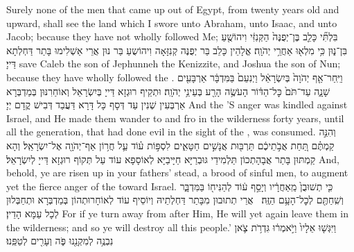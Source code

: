 {Surely none of the men that came up out of Egypt, from twenty years old and upward, shall see the land which I swore unto Abraham, unto Isaac, and unto Jacob; because they have not wholly followed Me;}{}
{בִּלְתִּ֞י כָּלֵ֤ב בֶּן־יְפֻנֶּה֙ הַקְּנִזִּ֔י וִיהוֹשֻׁ֖עַ בִּן־נ֑וּן כִּ֥י מִלְא֖וּ אַחֲרֵ֥י יְהֹוָֽה׃
}
{אֱלָהֵין כָּלֵב בַּר יְפֻנֶּה קְנִזָּאָה וִיהוֹשֻעַ בַּר נוּן אֲרֵי אַשְׁלִימוּ בָּתַר דַּחְלְתָא דַּייָ׃}
{save Caleb the son of Jephunneh the Kenizzite, and Joshua the son of Nun; because they have wholly followed the \lord.}{}
{וַיִּֽחַר־אַ֤ף יְהֹוָה֙ בְּיִשְׂרָאֵ֔ל וַיְנִעֵם֙ בַּמִּדְבָּ֔ר אַרְבָּעִ֖ים שָׁנָ֑ה עַד־תֹּם֙ כׇּל־הַדּ֔וֹר הָעֹשֶׂ֥ה הָרַ֖ע בְּעֵינֵ֥י יְהֹוָֽה׃
}
{וּתְקֵיף רוּגְזָא דַּייָ בְּיִשְׂרָאֵל וְאוֹחַרִנּוּן בְּמַדְבְּרָא אַרְבְּעִין שְׁנִין עַד דְּסָף כָּל דָּרָא דַּעֲבַד דְּבִישׁ קֳדָם יְיָ׃}
{And the \lord’S anger was kindled against Israel, and He made them wander to and fro in the wilderness forty years, until all the generation, that had done evil in the sight of the \lord, was consumed.}{}
{וְהִנֵּ֣ה קַמְתֶּ֗ם תַּ֚חַת אֲבֹ֣תֵיכֶ֔ם תַּרְבּ֖וּת אֲנָשִׁ֣ים חַטָּאִ֑ים לִסְפּ֣וֹת ע֗וֹד עַ֛ל חֲר֥וֹן אַף־יְהֹוָ֖ה אֶל־יִשְׂרָאֵֽל׃
}
{וְהָא קַמְתּוּן בָּתַר אֲבָהָתְכוֹן תַּלְמִידֵי גּוּבְרַיָּא חַיָּיבַיָּא לְאוֹסָפָא עוֹד עַל תְּקוֹף רוּגְזָא דַּייָ לְיִשְׂרָאֵל׃}
{And, behold, ye are risen up in your fathers’ stead, a brood of sinful men, to augment yet the fierce anger of the \lord\space toward Israel.}{}
{כִּ֤י תְשׁוּבֻן֙ מֵֽאַחֲרָ֔יו וְיָסַ֣ף ע֔וֹד לְהַנִּיח֖וֹ בַּמִּדְבָּ֑ר וְשִֽׁחַתֶּ֖ם לְכׇל־הָעָ֥ם הַזֶּֽה׃ \setuma }
{אֲרֵי תְתוּבוּן מִבָּתַר דַּחְלְתֵיהּ וְיוֹסֵיף עוֹד לְאוֹחָרוּתְהוֹן בְּמַדְבְּרָא וּתְחַבְּלוּן לְכָל עַמָּא הָדֵין׃}
{For if ye turn away from after Him, He will yet again leave them in the wilderness; and so ye will destroy all this people.’}{}
{וַיִּגְּשׁ֤וּ אֵלָיו֙ וַיֹּ֣אמְר֔וּ גִּדְרֹ֥ת צֹ֛אן נִבְנֶ֥ה לְמִקְנֵ֖נוּ פֹּ֑ה וְעָרִ֖ים לְטַפֵּֽנוּ׃
}
